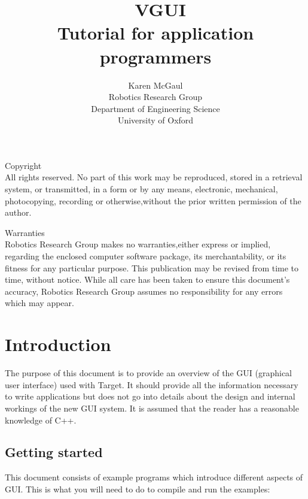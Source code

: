 \documentclass[12pt]{report}
\begin{document}
\title {\ VGUI \\ Tutorial for application programmers}

\author{Karen McGaul \\ Robotics Research Group \\ Department of
  Engineering Science\\ University of Oxford}

\maketitle
{}

{\sf\large Copyright} \\
All rights reserved. No part of this work may be reproduced, stored in
a retrieval system, or transmitted, in a form or by any means,
electronic, mechanical, photocopying, recording or otherwise,without
the prior written permission of the author.

\bigskip

{\sf\large Warranties} \\
Robotics Research Group makes no warranties,either express or implied,
regarding the enclosed computer software package, its merchantability,
or its fitness for any particular purpose. This publication may be
revised from time to time, without notice. 
While all care has been taken to ensure this document's accuracy,
Robotics Research Group assumes no responsibility for any errors which
may appear.

\newpage
\tableofcontents
\newpage

\chapter{Introduction}

The purpose of this document is to provide an overview of the 
GUI (graphical user interface) used with Target.  It should provide all the 
information necessary to write applications but does not go into 
details about the design and internal workings of the new GUI system.  It is 
assumed that the reader has a reasonable knowledge of C++.

\section{Getting started}

This document consists of example programs which introduce different aspects of GUI.
This is what you will need to do to compile and run the examples:
\end{document}
